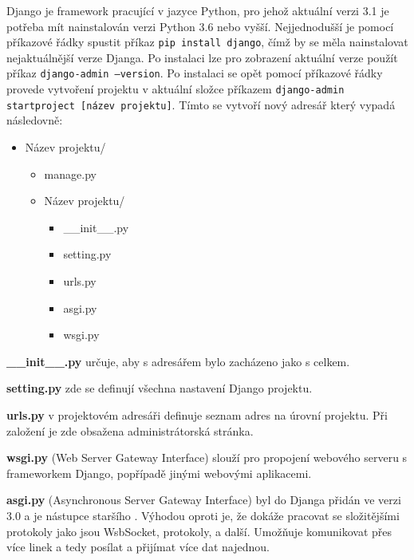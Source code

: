 Django je framework pracující v jazyce Python, pro jehož aktuální
verzi 3.1 je potřeba mít nainstalován verzi Python 3.6 nebo
vyšší. Nejjednodušší je pomocí příkazové řádky spustit příkaz {\tt pip
install django}, čímž by se měla nainstalovat nejaktuálnější verze
Djanga. Po instalaci lze pro zobrazení aktuální verze použít příkaz
{\tt django-admin --version}. Po instalaci se opět pomocí příkazové řádky
provede vytvoření projektu v aktuální složce příkazem {\tt django-admin
startproject [název projektu]}. \cite{django-init} Tímto se vytvoří nový adresář který
vypadá následovně:

\begin{itemize}
	\item \lbrack Název projektu\rbrack /
	\begin{itemize}
		\item manage.py
		\item \lbrack Název projektu\rbrack /
		\begin{itemize}
			\item \_\_init\_\_.py
			\item setting.py
			\item urls.py
			\item asgi.py
			\item wsgi.py
		\end{itemize}
	\end{itemize}
\end{itemize}

\vspace{6px}

\textbf{\_\_init\_\_.py} určuje, aby s adresářem bylo zacházeno jako s celkem.
\vspace{6px}

\textbf{setting.py} zde se definují všechna nastavení Django projektu. 
\vspace{6px}

\textbf{urls.py} v projektovém adresáři definuje seznam  adres na
úrovní projektu. Při založení je zde obsažena administrátorská
stránka.  \vspace{6px}

\textbf{wsgi.py} (Web Server Gateway Interface) slouží pro propojení
webového serveru s frameworkem Django, popřípadě jinými webovými
aplikacemi.  \vspace{6px}

\textbf{asgi.py} (Asynchronous Server Gateway Interface) byl do Djanga
přidán ve verzi 3.0 a je nástupce staršího . Výhodou  oproti
 je, že dokáže pracovat se složitějšími protokoly jako jsou
WsbSocket,  protokoly,  a další. Umožňuje komunikovat přes
více linek a tedy posílat a přijímat více dat najednou.  \vspace{6px}

